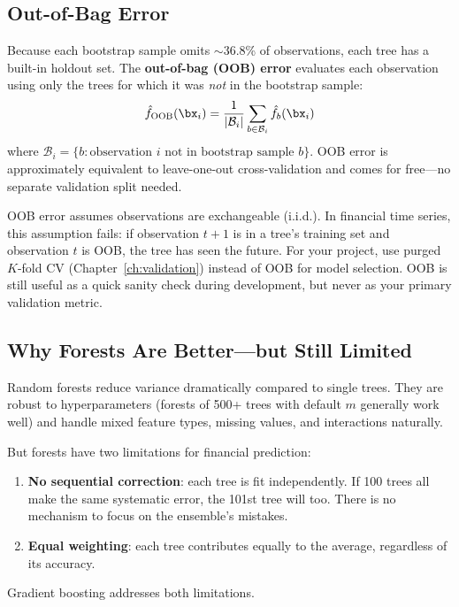 \subsection{Out-of-Bag Error}

Because each bootstrap sample omits $\sim$36.8\% of observations, each tree has a built-in holdout set.
The \textbf{out-of-bag (OOB) error} evaluates each observation using only the trees for which it was \emph{not} in the bootstrap sample:
\begin{equation}
\hat{f}_{\mathrm{OOB}}(\bx_i) = \frac{1}{|\mathcal{B}_i|} \sum_{b \in \mathcal{B}_i} \hat{f}_b(\bx_i)
\label{eq:oob-prediction}
\end{equation}
where $\mathcal{B}_i = \{b : \text{observation } i \text{ not in bootstrap sample } b\}$.
OOB error is approximately equivalent to leave-one-out cross-validation and comes for free---no separate validation split needed.

\begin{warning}
OOB error assumes observations are exchangeable (i.i.d.).
In financial time series, this assumption fails: if observation $t{+}1$ is in a tree's training set and observation $t$ is OOB, the tree has seen the future.
For your project, use purged $K$-fold CV (Chapter~\ref{ch:validation}) instead of OOB for model selection.
OOB is still useful as a quick sanity check during development, but never as your primary validation metric.
\end{warning}

\subsection{Why Forests Are Better---but Still Limited}

Random forests reduce variance dramatically compared to single trees.
They are robust to hyperparameters (forests of 500+ trees with default $m$ generally work well) and handle mixed feature types, missing values, and interactions naturally.

But forests have two limitations for financial prediction:
\begin{enumerate}[nosep]
  \item \textbf{No sequential correction}: each tree is fit independently. If 100 trees all make the same systematic error, the 101st tree will too. There is no mechanism to focus on the ensemble's mistakes.
  \item \textbf{Equal weighting}: each tree contributes equally to the average, regardless of its accuracy.
\end{enumerate}
Gradient boosting addresses both limitations.

